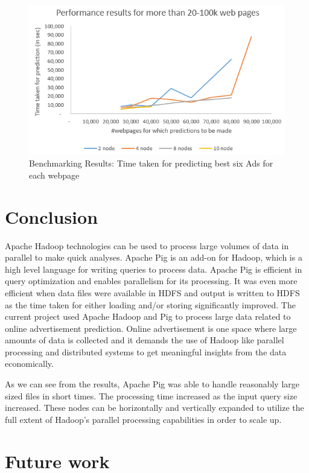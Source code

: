\documentclass[9pt,twocolumn,twoside]{../../styles/osajnl}
\begin{document}
\begin{figure}[hptb]
\centering
\includegraphics[width=\linewidth]{images/xlarge_100k.PNG}
\caption{ Benchmarking Results: Time taken for predicting best six Ads for each webpage}
\label{fig:xlarge_100k}
\end{figure}

\section{Conclusion}
Apache Hadoop technologies can be used to process large volumes of data in parallel to make quick analyses. Apache Pig is an add-on for Hadoop, which is a high level language for writing queries to process data. Apache Pig is efficient in query optimization and enables parallelism for its processing. It was even more efficient when data files were available in HDFS and output is written to HDFS as the time taken for either loading and/or storing significantly improved. The current project used Apache Hadoop and Pig to process large data related to online advertisement prediction. Online advertisement is one space where large amounts of data is collected and it demands the use of Hadoop like parallel processing and distributed systems to get meaningful insights from the data economically. 

As we can see from the results, Apache Pig was able to handle reasonably large sized files in short times. The processing time increased as the input query size increased. These nodes can be horizontally and vertically expanded to utilize the full extent of Hadoop's parallel processing capabilities in order to scale up. 

\section{Future work}
\end{document}
